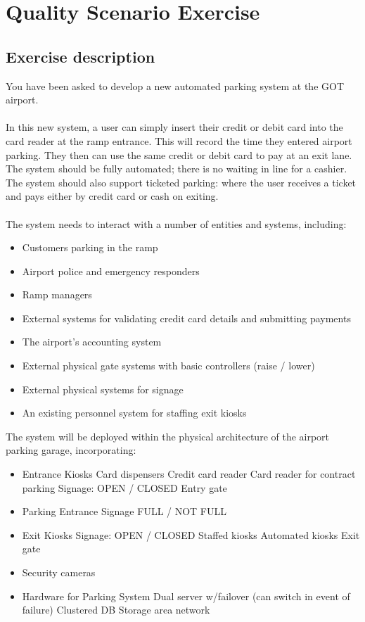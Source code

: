 \chapter{Quality Scenario Exercise}
\section{Exercise description}
You have been asked to develop a new automated parking system at the GOT airport.\\
\\
In this new system, a user can simply insert their credit or debit card into the card reader at the ramp entrance. This will record the time they entered airport parking. They then can use the same credit or debit card to pay at an exit lane. The system should be fully automated; there is no waiting in line for a cashier. The system should also support ticketed parking: where the user receives a ticket and pays either by credit card or cash on exiting.\\
\\
The system needs to interact with a number of entities and systems, including:
\begin{itemize}
	\item Customers parking in the ramp
	\item Airport police and emergency responders
	\item Ramp managers
	\item External systems for validating credit card details and submitting payments
	\item The airport’s accounting system
	\item External physical gate systems with basic controllers (raise / lower)
	\item External physical systems for signage
	\item An existing personnel system for staffing exit kiosks
\end{itemize}
The system will be deployed within the physical architecture of the airport parking garage,
incorporating:
\begin{itemize}[*]
	\item  Entrance Kiosks
	      \subitem  Card dispensers
	      \subitem  Credit card reader
	      \subitem  Card reader for contract parking
	      \subitem  Signage: {OPEN / CLOSED}
	      \subitem  Entry gate
	\item  Parking Entrance
	      \subitem  Signage {FULL / NOT FULL}
	\item  Exit Kiosks
	      \subitem  Signage: {OPEN / CLOSED}
	      \subitem  Staffed kiosks
	      \subitem  Automated kiosks
	      \subitem  Exit gate
	\item  Security cameras
	\item  Hardware for Parking System
	      \subitem  Dual server w/failover (can switch in event of failure)
	      \subitem  Clustered DB
	      \subitem  Storage area network
\end{itemize}
